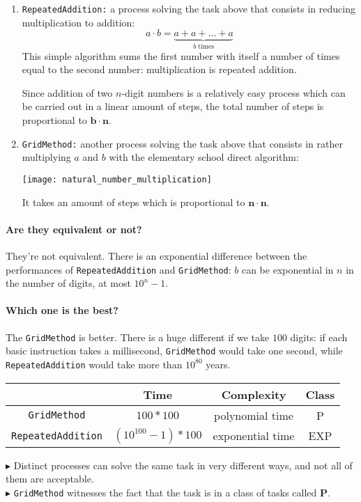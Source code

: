 \documentclass{article}
\begin{document}
			\begin{continueExample}
				{\small
				\begin{enumerate}[leftmargin=*]
					\item \texttt{RepeatedAddition:} a process solving the task above that consists in reducing multiplication to addition:
					$$a \cdot b = \underbrace{a + a + \dots + a}_{b\;\text{times}}$$
					This simple algorithm sums the first number with itself a number of times equal to the second number: multiplication is repeated addition.
					\vspace{0.1cm}
					
					Since addition of two $n$-digit numbers is a relatively easy process which can be carried out in a linear amount of steps, the total number of steps is proportional to $\mathbf{b \cdot n}$.
					\item \texttt{GridMethod:} another process solving the task above that consists in rather multiplying $a$ and $b$ with the elementary school direct algorithm:
					\begin{center}
						\texttt{[image: natural\_number\_multiplication]}
					\end{center}	
					It takes an amount of steps which is proportional to $\mathbf{n \cdot n}$.
				\end{enumerate}
				\vspace{0.3cm}
				\paragraph{\small Are they equivalent or not?}
				They're not equivalent. There is an exponential difference between the performances of \texttt{RepeatedAddition} and \texttt{GridMethod}: $b$ can be exponential in $n$ in the number of digits, at most $10^n - 1$.
				\paragraph{\small Which one is the best?}
				The \texttt{GridMethod} is better. There is a huge different if we take $100$ digits: if each basic instruction takes a millisecond, \texttt{GridMethod} would take one second, while \texttt{RepeatedAddition} would take more than $10^{80}$ years.
				\begin{center}
    				\begin{tabular}{c|c|c|c}
    					& \textbf{Time} & \textbf{Complexity} & \textbf{Class}\\
    					\hline
        				\texttt{GridMethod} & $100*100$ & polynomial time & P\\
        				\hline
        				\texttt{RepeatedAddition} & $(10^{100} - 1) * 100$ & exponential time & EXP\\
    				\end{tabular}
    			\end{center}
    			\vspace{0.2cm}
    			$\blacktriangleright$ Distinct processes can solve the same task in very different ways, and not all of them are acceptable.\\
    			$\blacktriangleright$ \texttt{GridMethod} witnesses the fact that the task is in a class of tasks called \textbf{P}.
    			}
			\end{continueExample}
\end{document}
